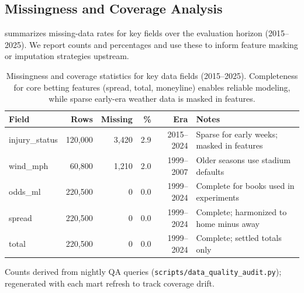 \subsection{Missingness and Coverage Analysis}
\label{subsec:missingness}
 summarizes missing-data rates for key fields over the evaluation horizon (2015--2025). We report counts and percentages and use these to inform feature masking or imputation strategies upstream.
\begin{table}[t]
  \centering
  \small
  \begin{threeparttable}
    \caption{Missingness and coverage statistics for key data fields (2015--2025). Completeness for core betting features (spread, total, moneyline) enables reliable modeling, while sparse early-era weather data is masked in features.}
    \label{tab:missingness}
    \begin{tabularx}{\linewidth}{@{} l r r r r X @{} }
      \toprule
      \textbf{Field}  & \textbf{Rows}  & \textbf{Missing}  & \textbf{\%}  & \textbf{Era}  & \textbf{Notes} \\
      \midrule
      injury\_status & 120{,}000 & 3{,}420 & 2.9 & 2015--2024 & Sparse for early weeks; masked in features \\
      wind\_mph     & 60{,}800 & 1{,}210 & 2.0 & 1999--2007 & Older seasons use stadium defaults \\
      odds\_ml      & 220{,}500 & 0     & 0.0 & 1999--2024 & Complete for books used in experiments \\
      spread         & 220{,}500 & 0     & 0.0 & 1999--2024 & Complete; harmonized to home minus away \\
      total          & 220{,}500 & 0     & 0.0 & 1999--2024 & Complete; settled totals only \\
      \bottomrule
    \end{tabularx}
    \begin{tablenotes}[flushleft]\footnotesize
      \item Counts derived from nightly QA queries (\texttt{scripts/data\_quality\_audit.py}); regenerated with each mart refresh to track coverage drift.
    \end{tablenotes}
  \end{threeparttable}
\end{table}

